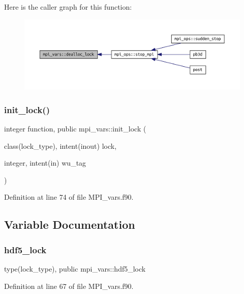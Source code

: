 Here is the caller graph for this function\+:
\nopagebreak
\begin{figure}[H]
\begin{center}
\leavevmode
\includegraphics[width=350pt]{namespacempi__vars_a91e7fdacc759ddeb3f14b4241549175c_icgraph}
\end{center}
\end{figure}
\mbox{\label{namespacempi__vars_acfa94ed816882b2e9215bffa1a6ad4a5}} 
\subsubsection{\texorpdfstring{init\+\_\+lock()}{init\_lock()}}
{\footnotesize\ttfamily integer function, public mpi\+\_\+vars\+::init\+\_\+lock (\begin{DoxyParamCaption}\item[{class(lock\+\_\+type), intent(inout)}]{lock,  }\item[{integer, intent(in)}]{wu\+\_\+tag }\end{DoxyParamCaption})}



Definition at line 74 of file M\+P\+I\+\_\+vars.\+f90.



\subsection{Variable Documentation}
\mbox{\label{namespacempi__vars_a834e19cd963fef0ad150e22aa3c56d53}} 
\subsubsection{\texorpdfstring{hdf5\+\_\+lock}{hdf5\_lock}}
{\footnotesize\ttfamily type(lock\+\_\+type), public mpi\+\_\+vars\+::hdf5\+\_\+lock}



Definition at line 67 of file M\+P\+I\+\_\+vars.\+f90.

